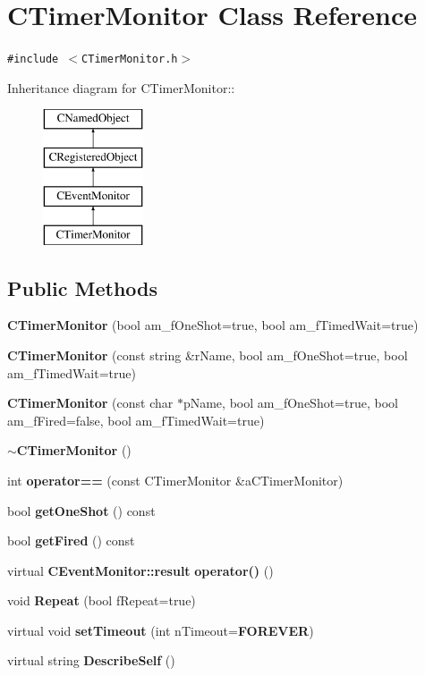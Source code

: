 \section{CTimer\-Monitor  Class Reference}
\label{classCTimerMonitor}
{\tt \#include $<$CTimer\-Monitor.h$>$}

Inheritance diagram for CTimer\-Monitor::\begin{figure}[H]
\begin{center}
\leavevmode
\includegraphics[height=4cm]{classCTimerMonitor}
\end{center}
\end{figure}
\subsection*{Public Methods}
\begin{CompactItemize}
\item 
{\bf CTimer\-Monitor} (bool am\_\-f\-One\-Shot=true, bool am\_\-f\-Timed\-Wait=true)
\item 
{\bf CTimer\-Monitor} (const string \&r\-Name, bool am\_\-f\-One\-Shot=true, bool am\_\-f\-Timed\-Wait=true)
\item 
{\bf CTimer\-Monitor} (const char $\ast$p\-Name, bool am\_\-f\-One\-Shot=true, bool am\_\-f\-Fired=false, bool am\_\-f\-Timed\-Wait=true)
\item 
{\bf $\sim$CTimer\-Monitor} ()
\item 
int {\bf operator==} (const CTimer\-Monitor \&a\-CTimer\-Monitor)
\item 
bool {\bf get\-One\-Shot} () const
\item 
bool {\bf get\-Fired} () const
\item 
virtual {\bf CEvent\-Monitor::result} {\bf operator()} ()
\item 
void {\bf Repeat} (bool f\-Repeat=true)
\item 
virtual void {\bf set\-Timeout} (int n\-Timeout={\bf FOREVER})
\item 
virtual string {\bf Describe\-Self} ()
\end{CompactItemize}
